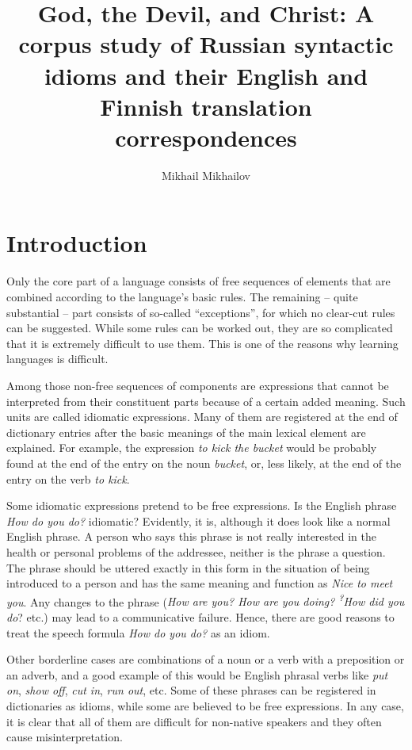 \documentclass[output=paper]{langscibook}
\author{Mikhail Mikhailov\affiliation{Tampere University}\orcid{}}
\title[God, the Devil, and Christ]{God, the Devil, and Christ: A corpus study of Russian syntactic idioms and their English and Finnish translation correspondences}
\begin{document}
\maketitle 



\section{Introduction}

Only the core part of a language consists of free sequences of elements that are combined according to the language’s basic rules. The remaining – quite substantial – part consists of so-called “exceptions”, for which no clear-cut rules can be suggested. While some rules can be worked out, they are so complicated that it is extremely difficult to use them. This is one of the reasons why learning languages is difficult.

Among those non-free sequences of components are expressions that cannot be interpreted from their constituent parts because of a certain added meaning. Such units are called idiomatic expressions. Many of them are registered at the end of dictionary entries after the basic meanings of the main lexical element are explained. For example, the expression \textit{to kick the bucket} would be probably found at the end of the entry on the noun \textit{bucket}, or, less likely, at the end of the entry on the verb \textit{to kick}. 

Some idiomatic expressions pretend to be free expressions. Is the English phrase \textit{How do you do?} idiomatic? Evidently, it is, although it does look like a normal English phrase. A person who says this phrase is not really interested in the health or personal problems of the addressee, neither is the phrase a question. The phrase should be uttered exactly in this form in the situation of being introduced to a person and has the same meaning and function as \textit{Nice to meet you}. Any changes to the phrase (\textit{How are you? How are you doing? \textsuperscript{?}}\textit{How did you do}? etc.) may lead to a communicative failure. Hence, there are good reasons to treat the speech formula \textit{How do you do?} as an idiom.

Other borderline cases are combinations of a noun or a verb with a preposition or an adverb, and a good example of this would be English phrasal verbs like \textit{put on}, \textit{show off}, \textit{cut in}, \textit{run out}, etc. Some of these phrases can be registered in dictionaries as idioms, while some are believed to be free expressions. In any case, it is clear that all of them are difficult for non-native speakers and they often cause misinterpretation.
\end{document}
